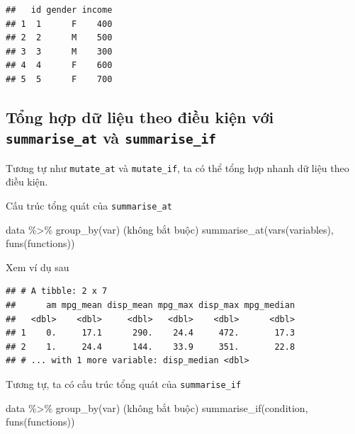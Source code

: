 \documentclass[]{krantz}
\makeatletter
\newenvironment{Shaded}{\begin{snugshade}}{\end{snugshade}}
\newcommand{\KeywordTok}[1]{\textcolor[rgb]{0.27,0.27,0.27}{\textbf{#1}}}
\newcommand{\NormalTok}[1]{#1}
\newcommand{\OperatorTok}[1]{\textcolor[rgb]{0.43,0.43,0.43}{\textbf{#1}}}
\newcommand{\StringTok}[1]{\textcolor[rgb]{0.5,0.5,0.5}{#1}}
\renewenvironment{quote}{\begin{VF}}{\end{VF}}
\newenvironment{kframe}{%
\medskip{}
\setlength{\fboxsep}{.8em}
 \def\at@end@of@kframe{}%
 \ifinner\ifhmode%
  \def\at@end@of@kframe{\end{minipage}}%
  \begin{minipage}{\columnwidth}%
 \fi\fi%
 \def\FrameCommand##1{\hskip\@totalleftmargin \hskip-\fboxsep
 \colorbox{shadecolor}{##1}\hskip-\fboxsep
     \hskip-\linewidth \hskip-\@totalleftmargin \hskip\columnwidth}%
 \MakeFramed {\advance\hsize-\width
   \@totalleftmargin\z@ \linewidth\hsize
   \@setminipage}}%
 {\par\unskip\endMakeFramed%
 \at@end@of@kframe}
\renewenvironment{Shaded}{\begin{kframe}}{\end{kframe}}
\renewenvironment{Shaded}{\begin{snugshade}}{\end{snugshade}}
\renewcommand{\KeywordTok}[1]{\textcolor[rgb]{0.13,0.29,0.53}{\textbf{#1}}}
\renewcommand{\NormalTok}[1]{#1}
\renewcommand{\OperatorTok}[1]{\textcolor[rgb]{0.81,0.36,0.00}{\textbf{#1}}}
\renewcommand{\StringTok}[1]{\textcolor[rgb]{0.31,0.60,0.02}{#1}}
\theoremstyle{definition}
\theoremstyle{definition}
\theoremstyle{definition}
\theoremstyle{remark}
\makeatother
\begin{document}
\begin{verbatim}
##   id gender income
## 1  1      F    400
## 2  2      M    500
## 3  3      M    300
## 4  4      F    600
## 5  5      F    700
\end{verbatim}

\hypertarget{tng-hp-d-liu-theo-iu-kin-vi-summarise_at-va-summarise_if}{%
\subsection{\texorpdfstring{Tổng hợp dữ liệu theo điều kiện với
\texttt{summarise\_at} và
\texttt{summarise\_if}}{Tổng hợp dữ liệu theo điều kiện với summarise\_at và summarise\_if}}\label{tng-hp-d-liu-theo-iu-kin-vi-summarise_at-va-summarise_if}}

Tương tự như \texttt{mutate\_at} và \texttt{mutate\_if}, ta có thể tổng
hợp nhanh dữ liệu theo điều kiện.

Cấu trúc tổng quát của \texttt{summarise\_at}

\begin{quote}
data \%\textgreater{}\% group\_by(var) (không bắt buộc)
summarise\_at(vars(variables), funs(functions))
\end{quote}

Xem ví dụ sau

\begin{Shaded}
\end{Shaded}

\begin{verbatim}
## # A tibble: 2 x 7
##      am mpg_mean disp_mean mpg_max disp_max mpg_median
##   <dbl>    <dbl>     <dbl>   <dbl>    <dbl>      <dbl>
## 1    0.     17.1      290.    24.4     472.       17.3
## 2    1.     24.4      144.    33.9     351.       22.8
## # ... with 1 more variable: disp_median <dbl>
\end{verbatim}

Tương tự, ta có cấu trúc tổng quát của \texttt{summarise\_if}

\begin{quote}
data \%\textgreater{}\% group\_by(var) (không bắt buộc)
summarise\_if(condition, funs(functions))
\end{quote}
\end{document}
